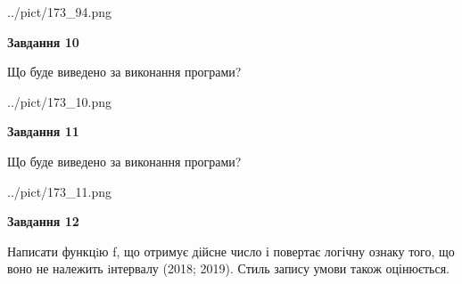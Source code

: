 \documentclass[12pt, ukrainian]{article}
\begin{document}
{\begin {large}
\begin{center}
	{../pict/173_94.png}
\end{center}
\newpage

{\begin {center}\textbf{Завдання 10}\end {center}}

Що буде виведено за виконання програми?\par
\begin{center}
	{../pict/173_10.png}
\end{center}
\newpage

{\begin {center}\textbf{Завдання 11}\end {center}}

Що буде виведено за виконання програми?\par
\begin{center}
	{../pict/173_11.png}
\end{center}
\newpage

{\begin {center}\textbf{Завдання 12}\end {center}}


Написати функцiю f, що отримує дійсне число і повертає логічну ознаку того, що воно не належить iнтервалу (2018; 2019). Стиль запису умови також оцінюється.\par
\newpage

\end {large}}
\end{document}
